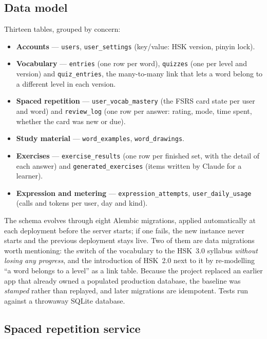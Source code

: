 \documentclass[11pt,a4paper]{article}
\begin{document}
\subsection{Data model}

Thirteen tables, grouped by concern:

{\sloppy
\begin{itemize}
  \item \textbf{Accounts} --- \texttt{users}, \texttt{user\_settings}
        (key/value: HSK version, pinyin lock).
  \item \textbf{Vocabulary} --- \texttt{entries} (one row per word),
        \texttt{quizzes} (one per level and version) and
        \texttt{quiz\_entries}, the many-to-many link that lets a word belong
        to a different level in each version.
  \item \textbf{Spaced repetition} --- \texttt{user\_vocab\_mastery} (the FSRS
        card state per user and word) and \texttt{review\_log} (one row per
        answer: rating, mode, time spent, whether the card was new or due).
  \item \textbf{Study material} --- \texttt{word\_examples},
        \texttt{word\_drawings}.
  \item \textbf{Exercises} --- \texttt{exercise\_results} (one row per finished
        set, with the detail of each answer) and \texttt{generated\_exercises}
        (items written by Claude for a learner).
  \item \textbf{Expression and metering} --- \texttt{expression\_attempts},
        \texttt{user\_daily\_usage} (calls and tokens per user, day and kind).
\end{itemize}}

The schema evolves through eight Alembic migrations, applied automatically at
each deployment before the server starts; if one fails, the new instance never
starts and the previous deployment stays live. Two of them are data migrations
worth mentioning: the switch of the vocabulary to the HSK~3.0 syllabus
\emph{without losing any progress}, and the introduction of HSK~2.0 next to it
by re-modelling ``a word belongs to a level'' as a link table. Because the
project replaced an earlier app that already owned a populated production
database, the baseline was \emph{stamped} rather than replayed, and later
migrations are idempotent. Tests run against a throwaway SQLite database.

\subsection{Spaced repetition service}
\end{document}
